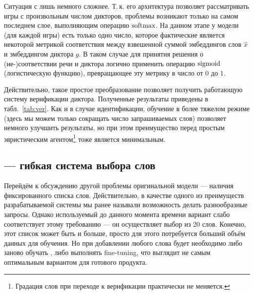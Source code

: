 Ситуация с \guesser{} лишь немного сложнее. Т.\,к. его архитектура позволяет
рассматривать игры с произвольным числом дикторов, проблемы возникают только на
самом последнем слое, выполняющим операцию $\operatorname{\text{softmax}}$. На данном этапе у
модели (для каждой игры) есть только одно число, которое фактические является
некоторой метрикой соответствия между взвешенной суммой эмбеддингов слов
$\hat{x}$ и эмбеддингом диктора $g$. В таком случае для принятия решения о
(не-)соответствии речи и диктора логично применить операцию $\operatorname{\text{sigmoid}}$
(логистическую функцию), превращающее эту метрику в число от $0$ до $1$.

Действительно, такое простое преобразование позволяет получить работающую
систему верификации диктора. Полученные результаты приведены в
табл.~\ref{tab:ver}. Как и в случае идентификации, обучение в более тяжелом
режиме (здесь мы можем только сокращать число запрашиваемых слов) позволяет
немного улучшить результаты, но при этом преимущество перед простым эвристическим
агентом\footnote{
    Градация слов при переходе к верификации практически не меняется.
} тоже является минимальным.

\subsection{\cbenquirer{} --- гибкая система выбора слов}\label{ssec:codebook}

Перейдём к обсуждению другой проблемы оригинальной модели --- наличия
фиксированного списка слов. Действительно, в качестве одного из преимуществ
разрабатываемой системы мы ранее называли возможность делать разнообразные
запросы. Однако используемый до данного момента времени вариант \enquirer{}
слабо соответствует этому требованию --- он осуществляет выбор из 20 слов.
Конечно, этот список может быть и больше, просто для этого потребуется больший
объём данных для обучения. Но при добавлении любого слова будет необходимо либо
заново обучать \enquirer{}, либо выполнять fine-tuning, что выглядит не самым
оптимальным вариантом для готового продукта.

